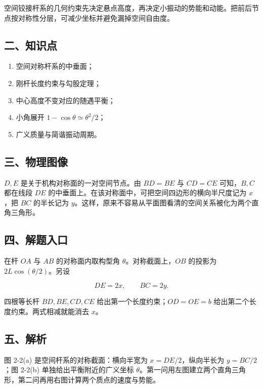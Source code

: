 \documentclass[12pt,a4paper,UTF8]{ctexart}
\newcommand{\tightlist}{\setlength{\itemsep}{0pt}\setlength{\parskip}{0pt}}
\begin{document}
空间铰接杆系的几何约束先决定悬点高度，再决定小振动的势能和动能。把前后节点按对称性分层，可减少坐标并避免漏掉空间自由度。

\subsection{二、知识点}\label{ux4e8cux77e5ux8bc6ux70b9-1}

\begin{enumerate}
\def\labelenumi{\arabic{enumi}.}
\tightlist
\item
  空间对称杆系的中垂面；
\item
  刚杆长度约束与勾股定理；
\item
  中心高度不变对应的随遇平衡；
\item
  小角展开 \(1-\cos\theta\simeq\theta^2/2\)；
\item
  广义质量与简谐振动周期。
\end{enumerate}

\subsection{三、物理图像}\label{ux4e09ux7269ux7406ux56feux50cf-1}

\(D,E\) 是关于机构对称面的一对空间节点。由 \(BD=BE\) 与 \(CD=CE\)
可知，\(B,C\) 都在线段 \(DE\)
的中垂面上。在该对称面中，可把空间四边形的横向半尺度记为 \(x\)，把
\(BC\) 的半长记为
\(y\)。这样，原来不容易从平面图看清的空间关系被化为两个直角三角形。

\subsection{四、解题入口}\label{ux56dbux89e3ux9898ux5165ux53e3-1}

在杆 \(OA\) 与 \(AB\) 的对称面内取构型角 \(\theta\)。对称截面上，\(OB\)
的投影为 \(2L\cos(\theta/2)\)。另设

\[
DE=2x,\qquad BC=2y.
\]

四根等长杆 \(BD,BE,CD,CE\) 给出第一个长度约束；\(OD=OE=b\)
给出第二个长度约束。两式相减就能消去 \(x\)。

\subsection{五、解析}\label{ux4e94ux89e3ux6790-1}

图 2-2(a) 是空间杆系的对称截面：横向半宽为 \(x=DE/2\)，纵向半长为
\(y=BC/2\)；图 2-2(b) 单独给出平衡附近的广义坐标
\(\theta\)。第一问用左图建立两个直角三角形，第二问再用右图计算两个质点的速度与势能。
\end{document}
